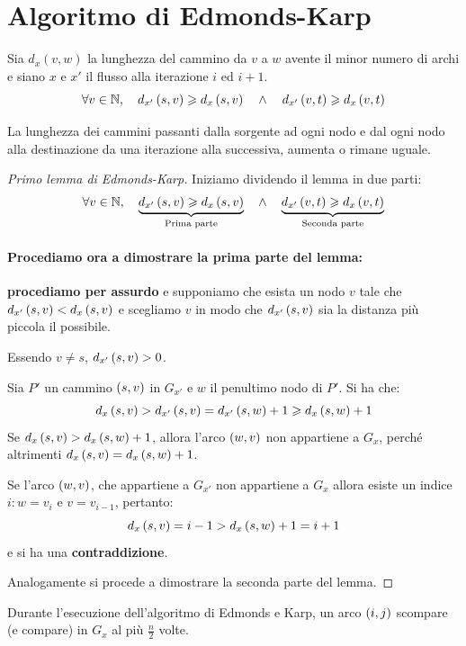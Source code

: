 \documentclass[\main/main.tex]{subfiles}
\begin{document}
\section{Algoritmo di Edmonds-Karp}
\begin{lemma}\label{first_lemma_karp}
  Sia \(d_x(v,w)\) la lunghezza del cammino da \(v\) a \(w\) avente il minor numero di archi e siano \(x\) e \(x'\) il flusso alla iterazione \(i\) ed \(i+1\).
  \[
    \forall v \in \mathbb{N}, \quad d_{x'}\left(s, v\right) \geqslant d_{x}\left(s, v\right) \quad \land \quad d_{x'}\left(v, t\right) \geqslant d_{x}\left(v, t\right)
  \]

  La lunghezza dei cammini passanti dalla sorgente ad ogni nodo e dal ogni nodo alla destinazione da una iterazione alla successiva, aumenta o rimane uguale.
\end{lemma}
\begin{proof}[Primo lemma di Edmonds-Karp]
  Iniziamo dividendo il lemma in due parti:
  \[
    \forall v \in \mathbb{N}, \quad \underbrace{d_{x'}\left(s, v\right) \geqslant d_{x}\left(s, v\right)}_{\text{Prima parte}} \quad \land \quad \underbrace{d_{x'}\left(v, t\right) \geqslant d_{x}\left(v, t\right)}_{\text{Seconda parte}}
  \]
  \paragraph*{Procediamo ora a dimostrare la prima parte del lemma:} \textbf{procediamo per assurdo} e supponiamo che esista un nodo \(v\) tale che \(d_{x'}\left(s, v\right) < d_x\left(s, v\right)\) e scegliamo \(v\) in modo che \(d_{x'}\left(s, v\right)\) sia la distanza più piccola il possibile.

  Essendo \(v \neq s\), \(d_{x'}\left(s, v\right) > 0\).

  Sia \(P'\) un cammino \(\left(s, v\right)\) in \(G_{x'}\) e \(w\) il penultimo nodo di \(P'\). Si ha che:
  \[
    d_{x}\left(s, v\right) > d_{x'}\left(s, v\right) = d_{x'}\left(s, w\right) + 1 \geqslant d_{x}\left(s, w\right) + 1
  \]
  Se \(d_{x}\left(s, v\right) > d_{x}\left(s, w\right) + 1\), allora l'arco \(\left(w, v\right)\) non appartiene a \(G_x\), perché altrimenti \(d_x\left(s, v\right) = d_x\left(s, w\right)+1\).

  Se l'arco \(\left(w, v\right)\), che appartiene a \(G_{x'}\) non appartiene a \(G_x\) allora esiste un indice \(i: w = v_ i\) e \(v = v_{i-1}\), pertanto:
  \[
    d_{x}\left(s, v\right) = i -1 > d_{x}\left(s, w\right) + 1 = i+1
  \]
  e si ha una \textbf{contraddizione}.

  Analogamente si procede a dimostrare la seconda parte del lemma.
\end{proof}
\begin{lemma}\label{second_lemma_karp}
  Durante l'esecuzione dell'algoritmo di Edmonds e Karp, un arco \(\left(i,j\right)\) scompare (e compare) in \(G_{x}\) al più \(\frac{n}{2}\) volte.
\end{lemma}
\end{document}
